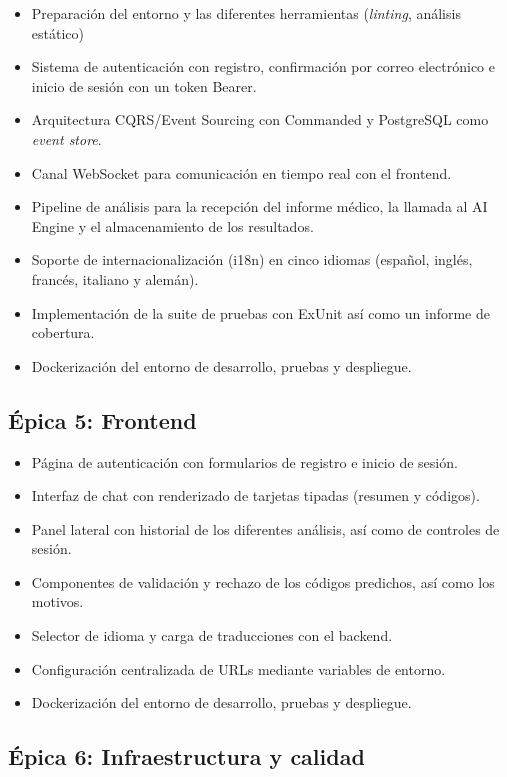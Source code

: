 \begin{itemize}[noitemsep]
 \item Preparación del entorno y las diferentes herramientas (\emph{linting}, análisis estático)
 \item Sistema de autenticación con registro, confirmación por correo electrónico e inicio de sesión con un token Bearer.
 \item Arquitectura CQRS/Event Sourcing con Commanded y PostgreSQL como \emph{event store}.
 \item Canal WebSocket para comunicación en tiempo real con el frontend.
 \item Pipeline de análisis para la recepción del informe médico, la llamada al AI Engine y el almacenamiento de los resultados.
 \item Soporte de internacionalización (i18n) en cinco idiomas (español, inglés, francés, italiano y alemán).
 \item Implementación de la suite de pruebas con ExUnit así como un informe de cobertura.
 \item Dockerización del entorno de desarrollo, pruebas y despliegue.
\end{itemize}

\subsection{Épica 5: Frontend}

\begin{itemize}[noitemsep]
 \item Página de autenticación con formularios de registro e inicio de sesión.
 \item Interfaz de chat con renderizado de tarjetas tipadas (resumen y códigos).
 \item Panel lateral con historial de los diferentes análisis, así como de controles de sesión.
 \item Componentes de validación y rechazo de los códigos predichos, así como los motivos.
 \item Selector de idioma y carga de traducciones con el backend.
 \item Configuración centralizada de URLs mediante variables de entorno.
 \item Dockerización del entorno de desarrollo, pruebas y despliegue.
\end{itemize}

\subsection{Épica 6: Infraestructura y calidad}

